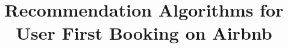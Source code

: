 \documentclass{sig-alternate-05-2015}
\begin{document}


%

\title{Recommendation Algorithms for User First Booking on Airbnb}
%
%
%
%
%
\end{document}
